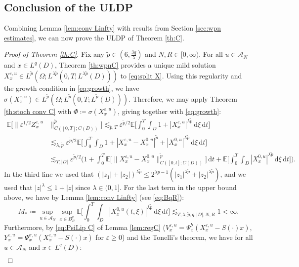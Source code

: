 \documentclass[10pt,a4paper]{amsart}
\numberwithin{equation}{section}
\newcommand{\Cper}{C(D)}
\newcommand{\ceqq}{\coloneqq}
\newcommand{\E}{{\mathbb E}}
\newcommand{\eps}{\varepsilon}
\newcommand{\Om}{\Omega}
\newcommand{\A}{{\mathcal A}}
\newcommand{\dd}{\,\mathrm{d}}
\begin{document}
\subsection{Conclusion of the ULDP}\label{sub:concl C}

Combining Lemma \ref{lem:conv Linfty} with   results from Section \ref{sec:wpn estimates}, we can now prove the ULDP of Theorem \ref{th:C}. 


\begin{proof}[Proof of Theorem \ref{th:C}] 
Fix any $\tilde p\in(6,\frac{3q}{\lambda})$ and $N,R\in[0,\infty)$. For all $u\in\A_N$ and $x\in L^q(D)$,  Theorem \ref{th:wpnC} provides a unique mild solution  $X_x^{\eps,u}\in L^{\tilde p}(\Om; L^{\lambda\tilde p}(0,T;L^{\lambda\tilde p}(D)))$ to \eqref{eq:split X}. Using this regularity and the growth condition in \eqref{eq:growth}, we have $\sigma(X_x^{\eps,u})\in  
L^{\tilde p}(\Om;L^{\tilde p}(0,T;L^{\tilde p}(D)))$. 
Therefore, we may apply Theorem \ref{th:stoch conv C} with $\Phi\ceqq \sigma(X_x^{\eps,u})$, giving together with \eqref{eq:growth}:  
\begin{align*}
\E[ \|\eps^{1/2}Z_x^{\eps,u}&\|_{C([0,T];\Cper)}^{\tilde p}] 
\lesssim_{\tilde p,T}\eps^{\tilde p/2}\E\Big[\int_0^T\int_D 1+|X_x^{\eps,u}|^{\lambda \tilde p}\dd\xi\dd t\Big]\\
&\lesssim_{\lambda, \tilde p}\eps^{\tilde p/2}\E\Big[\int_0^T\int_D 1+ |X_x^{\eps,u}-X_x^{0,u}|^{\tilde p}+|X_x^{0,u}|^{\lambda \tilde p}\dd\xi\dd t\Big] \\
&\lesssim_{T,|D|}\eps^{\tilde p/2}\bigg(1+\int_0^T \E\big[\|X_x^{\eps,u}-X_x^{0,u}\|_{C([0,t];\Cper)}^{\tilde p}\big]\dd t+\E\Big[\int_0^T\int_D  |X_x^{0,u}|^{\lambda \tilde p}\dd\xi\dd t\Big]\bigg). 
\end{align*}
In the third line we used that $(|z_1|+|z_2|)^{\lambda \tilde p}\leq 2^{\lambda \tilde p-1}( |z_1|^{\lambda \tilde p}+|z_2|^{\lambda \tilde p})$, and we used that $|z|^\lambda\leq 1+|z|$ since $\lambda\in(0,1]$. 
For the last term in the upper bound above, we have by Lemma \ref{lem:conv Linfty} (see \eqref{eq:BqR}): 
\[
M_*\ceqq\sup_{u\in\A_N}\sup_{x\in B_R^q} \E\Big[\int_0^T\int_D  |X_x^{0,u}(t,\xi)|^{\lambda\tilde p}\dd\xi\dd t\Big]\lesssim_{T,\lambda,\tilde p,q,|D|, N,R}1<\infty.
\]
Furthermore, by \eqref{eq:PsiLip C} of Lemma  \ref{lem:regC} ($V_x^{\eps,u}=\Psi_x^b(X_x^{\eps,u}-S(\cdot)x)$, $Y_x^{\eps,u}=\Psi_x^{\sigma,u}(X_x^{\eps,u}-S(\cdot)x)$ for $\eps\geq 0$) and the Tonelli's theorem, we have for all $u\in\A_N$ and $x\in L^q(D)$: 
\begin{align*}

\end{align*}
\end{proof}
\end{document}
